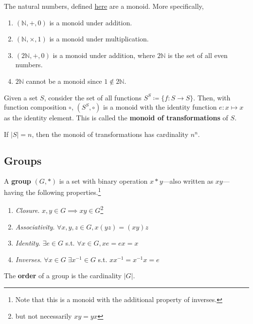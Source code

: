   \begin{example}
    The natural numbers, defined \hyperref[st-naturals]{here} are a monoid. More specifically, 
    \begin{enumerate}
      \item $(\mathbb{N}, +, 0)$ is a monoid under addition. 
      \item $(\mathbb{N}, \times, 1)$ is a monoid under multiplication. 
      \item $(2\mathbb{N}, +, 0)$ is a monoid under addition, where $2\mathbb{N}$ is the set of all even numbers. 
      \item $2\mathbb{N}$ cannot be a monoid since $1 \not\in 2\mathbb{N}$. 
    \end{enumerate}
  \end{example}

  \begin{definition}
    Given a set $S$, consider the set of all functions $S^S \coloneqq \{f: S \rightarrow S\}$. Then, with function composition $\circ$, $(S^S, \circ)$ is a monoid with the identity function $e: x \mapsto x$ as the identity element. This is called the \textbf{monoid of transformations} of $S$. 
  \end{definition} 

  \begin{theorem}
    If $|S| = n$, then the monoid of transformations has cardinality $n^n$. 
  \end{theorem}

\subsection{Groups}
  
  \begin{definition}[Group]
    A \textbf{group} $(G, \ast)$ is a set with binary operation $x \ast y$---also written as $xy$---having the following properties.\footnote{Note that this is a monoid with the additional property of inverses.}
    \begin{enumerate}
      \item \textit{Closure}. $x, y \in G \implies xy \in G$\footnote{but not necessarily $xy  = yx$}
      \item \textit{Associativity}. $\forall x, y, z \in G, x(yz) = (xy)z$
      \item \textit{Identity}. $\exists e \in G$ s.t. $\forall x \in G, xe = ex = x$
      \item \textit{Inverses}. $\forall x \in G \; \exists x^{-1} \in G$ s.t. $x x^{-1} = x^{-1} x = e$
    \end{enumerate}
    The \textbf{order} of a group is the cardinality $|G|$. 
  \end{definition} 

